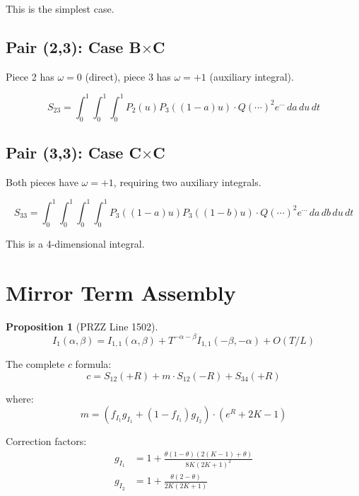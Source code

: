\documentclass[11pt]{article}
\newtheorem{proposition}{Proposition}
\begin{document}
This is the simplest case.

\subsection{Pair (2,3): Case B$\times$C}

Piece 2 has $\omega = 0$ (direct), piece 3 has $\omega = +1$ (auxiliary integral).

\begin{equation}
S_{23} = \int_0^1 \int_0^1 \int_0^1 P_2(u) P_3((1-a)u) \cdot Q(\cdots)^2 e^{\cdots} \, da\, du\, dt
\end{equation}

\subsection{Pair (3,3): Case C$\times$C}

Both pieces have $\omega = +1$, requiring two auxiliary integrals.

\begin{equation}
S_{33} = \int_0^1 \int_0^1 \int_0^1 \int_0^1 P_3((1-a)u) P_3((1-b)u) \cdot Q(\cdots)^2 e^{\cdots} \, da\, db\, du\, dt
\end{equation}

This is a 4-dimensional integral.

\section{Mirror Term Assembly}

\begin{proposition}[PRZZ Line 1502]
\begin{equation}
I_1(\alpha,\beta) = I_{1,1}(\alpha,\beta) + T^{-\alpha-\beta} I_{1,1}(-\beta,-\alpha) + O(T/L)
\end{equation}
\end{proposition}

The complete $c$ formula:
\begin{equation}
c = S_{12}(+R) + m \cdot S_{12}(-R) + S_{34}(+R)
\end{equation}

where:
\begin{equation}
m = (f_{I_1} g_{I_1} + (1-f_{I_1}) g_{I_2}) \cdot (e^R + 2K - 1)
\end{equation}

Correction factors:
\begin{align}
g_{I_1} &= 1 + \frac{\theta(1-\theta)(2(K-1)+\theta)}{8K(2K+1)^2} \\
g_{I_2} &= 1 + \frac{\theta(2-\theta)}{2K(2K+1)}
\end{align}
\end{document}
